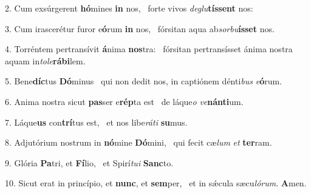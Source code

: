 2. Cum exsúrgerent \textbf{hó}mines \textbf{in} nos, \ast\  forte vivos \textit{de}\textit{glu}\textbf{tís}\textbf{sent} nos:\

3. Cum irascerétur furor e\textbf{ó}rum \textbf{in} nos, \ast\  fórsitan aqua ab\textit{sor}\textit{bu}\textbf{ís}\textbf{set} nos.\

4. Torréntem pertransívit \textbf{á}nima \textbf{nos}tra: \ast\  fórsitan pertransísset ánima nostra aquam in\textit{to}\textit{le}\textbf{rá}\textbf{bi}lem.\

5. Bene\textbf{díc}tus \textbf{Dó}minus \ast\  qui non dedit nos, in captiónem dénti\textit{bus} \textit{e}\textbf{ó}rum.\

6. Anima nostra sicut \textbf{pas}ser e\textbf{rép}ta est \ast\  de láque\textit{o} \textit{ve}\textbf{nán}\textbf{ti}um.\

7. Láque\textbf{us} con\textbf{trí}tus est, \ast\  et nos libe\textit{rá}\textit{ti} \textbf{su}mus.\

8. Adjutórium nostrum in \textbf{nó}mine \textbf{Dó}mini, \ast\  qui fecit cæ\textit{lum} \textit{et} \textbf{ter}ram.\

9. Glória \textbf{Pa}tri, et \textbf{Fí}lio, \ast\  et Spirí\textit{tu}\textit{i} \textbf{Sanc}to.\

10. Sicut erat in princípio, et \textbf{nunc}, et \textbf{sem}per, \ast\  et in sǽcula sæcu\textit{ló}\textit{rum}. \textbf{A}men.\


